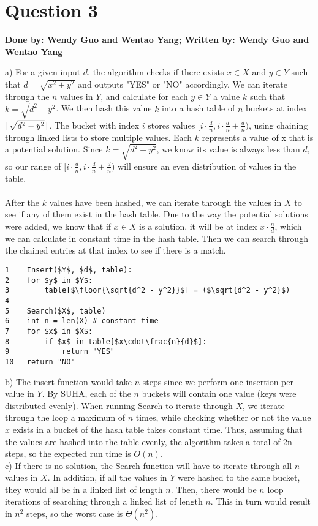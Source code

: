 \documentclass[20pt]{article}
\DeclarePairedDelimiter\floor{\lfloor}{\rfloor}
\begin{document}
\section*{Question 3}
\textbf{Done by: Wendy Guo and Wentao Yang; Written by: Wendy Guo and Wentao Yang}\\
\noindent
\begin{text}
    a) For a given input $d$, the algorithm checks if there exists $x \in X$ and $y \in Y$ such that $d = \sqrt{x^2 + y^2}$ and outputs "YES" or "NO" accordingly. We can iterate through the $n$ values in $Y$, and calculate for each $y \in Y$ a value $k$ such that $k = \sqrt{d^2 - y^2}$. We then hash this value $k$ into a hash table of $n$ buckets at index $\floor{\sqrt{d^2 - y^2}}$. The bucket with index $i$ stores values $[i\cdot\frac{d}{n}, i\cdot\frac{d}{n} + \frac{d}{n})$, using chaining through linked lists to store multiple values. Each $k$ represents a value of x that is a potential solution. Since $k = \sqrt{d^2 - y^2}$, we know its value is always less than $d$, so our range of $[i\cdot\frac{d}{n}, i\cdot\frac{d}{n} + \frac{d}{n})$ will ensure an even distribution of values in the table. \\ \\
    After the $k$ values have been hashed, we can iterate through the values in $X$ to see if any of them exist in the hash table. Due to the way the potential solutions were added, we know that if $x \in X$ is a solution, it will be at index $x\cdot\frac{n}{d}$, which we can calculate in constant time in the hash table. Then we can search through the chained entries at that index to see if there is a match.
\end{text}
\begin{lstlisting}[mathescape=true]
1    Insert($Y$, $d$, table): 
2    for $y$ in $Y$: 
3        table[$\floor{\sqrt{d^2 - y^2}}$] = ($\sqrt{d^2 - y^2}$)
4        
5    Search($X$, table)
6    int n = len(X) # constant time
7    for $x$ in $X$:
8        if $x$ in table[$x\cdot\frac{n}{d}$]:
9            return "YES"
10   return "NO"
\end{lstlisting}
\noindent
\begin{text}
    b) The insert function would take $n$ steps since we perform one insertion per value in $Y$. By SUHA, each of the $n$ buckets will contain one value (keys were distributed evenly). When running Search to iterate through $X$, we iterate through the loop a maximum of $n$ times, while checking whether or not the value $x$ exists in a bucket of the hash table takes constant time. Thus, assuming that the values are hashed into the table evenly, the algorithm takes a total of 2n steps, so the expected run time is $O(n)$. \\
    
    c) If there is no solution, the Search function will have to iterate through all $n$ values in $X$. In addition, if all the values in $Y$ were hashed to the same bucket, they would all be in a linked list of length $n$. Then, there would be $n$ loop iterations of searching through a linked list of length $n$. This in turn would result in $n^2$ steps, so the worst case is $\Theta(n^2)$.
    
\end{text}


\end{document}
